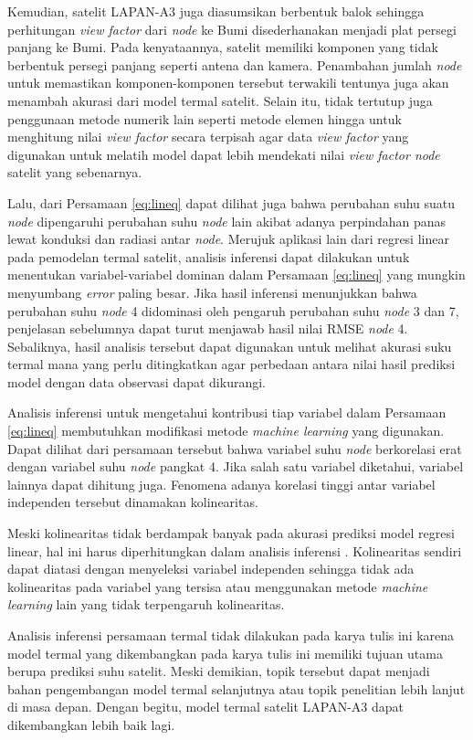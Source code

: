 Kemudian, satelit LAPAN-A3 juga diasumsikan berbentuk balok sehingga
perhitungan \textit{view factor} dari \textit{node} ke Bumi disederhanakan
menjadi plat persegi panjang ke Bumi. Pada kenyataannya, satelit memiliki
komponen yang tidak berbentuk persegi panjang seperti antena dan kamera.
Penambahan jumlah \textit{node} untuk memastikan komponen-komponen tersebut
terwakili tentunya juga akan menambah akurasi dari model termal satelit. Selain
itu, tidak tertutup juga penggunaan metode numerik lain seperti metode elemen
hingga untuk menghitung nilai \textit{view factor} secara terpisah agar data
\textit{view factor} yang digunakan untuk melatih model dapat lebih mendekati
nilai \textit{view factor node} satelit yang sebenarnya.

Lalu, dari Persamaan \ref{eq:lineq} dapat dilihat juga bahwa perubahan suhu
suatu \textit{node} dipengaruhi perubahan suhu \textit{node} lain akibat adanya
perpindahan panas lewat konduksi dan radiasi antar \textit{node}. Merujuk
aplikasi lain dari regresi linear pada pemodelan termal satelit, analisis
inferensi dapat dilakukan untuk menentukan variabel-variabel dominan dalam
Persamaan \ref{eq:lineq} yang mungkin menyumbang \textit{error} paling besar.
Jika hasil inferensi menunjukkan bahwa perubahan suhu \textit{node} 4
didominasi oleh pengaruh perubahan suhu \textit{node} 3 dan 7, penjelasan
sebelumnya dapat turut menjawab hasil nilai RMSE \textit{node} 4. Sebaliknya,
hasil analisis tersebut dapat digunakan untuk melihat akurasi suku termal mana
yang perlu ditingkatkan agar perbedaan antara nilai hasil prediksi model dengan
data observasi dapat dikurangi.

Analisis inferensi untuk mengetahui kontribusi tiap variabel dalam Persamaan
\ref{eq:lineq} membutuhkan modifikasi metode \textit{machine learning} yang
digunakan. Dapat dilihat dari persamaan tersebut bahwa variabel suhu
\textit{node} berkorelasi erat dengan variabel suhu \textit{node} pangkat 4.
Jika salah satu variabel diketahui, variabel lainnya dapat dihitung juga.
Fenomena adanya korelasi tinggi antar variabel independen tersebut dinamakan
kolinearitas. 

Meski kolinearitas tidak berdampak banyak pada akurasi prediksi model regresi
linear, hal ini harus diperhitungkan dalam analisis inferensi
\cite{lieberman2014}\cite{mundfrom2018}. Kolinearitas sendiri dapat diatasi
dengan menyeleksi variabel independen sehingga tidak ada kolinearitas pada
variabel yang tersisa atau menggunakan metode \textit{machine learning} lain
yang tidak terpengaruh kolinearitas.

Analisis inferensi persamaan termal tidak dilakukan pada karya tulis ini karena
model termal yang dikembangkan pada karya tulis ini memiliki tujuan utama
berupa prediksi suhu satelit. Meski demikian, topik tersebut dapat menjadi
bahan pengembangan model termal selanjutnya atau topik penelitian lebih lanjut
di masa depan. Dengan begitu, model termal satelit LAPAN-A3 dapat dikembangkan
lebih baik lagi.
